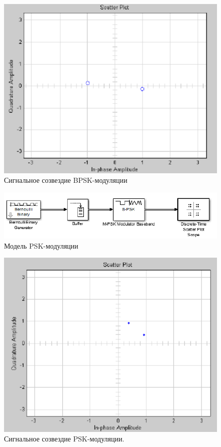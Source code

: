 \begin{figure}[H]
\includegraphics[width=150mm, scale = 0.9]{lab9/9_22}
   \caption{Сигнальное созвездие BPSK-модуляции}
\end{figure}



\begin{figure}[H]
\includegraphics[width=150mm, scale = 0.9]{lab9/9_23}
   \caption{Модель PSK-модуляции}
\end{figure}



\begin{figure}[H]
\includegraphics[width=150mm, scale = 0.9]{lab9/9_24}
   \caption{Сигнальное созвездие PSK-модуляции.}
\end{figure}



